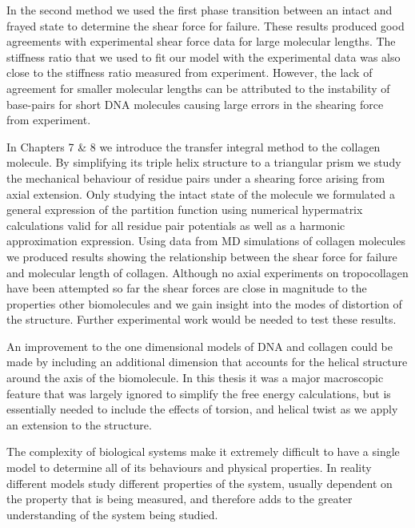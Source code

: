 In the second method we used the first phase transition between an intact and frayed state to determine the shear force for failure. These results produced good agreements with experimental shear force data for large molecular lengths. The stiffness ratio that we used to fit our model with the experimental data was also close to the stiffness ratio measured from experiment. However, the lack of agreement for smaller molecular lengths can be attributed to the instability of base-pairs for short DNA molecules causing large errors in the shearing force from experiment.

In Chapters 7 \& 8 we introduce the transfer integral method to the collagen molecule. By simplifying its triple helix structure to a triangular prism we study the mechanical behaviour of residue pairs under a shearing force arising from axial extension. Only studying the intact state of the molecule we formulated a general expression of the partition function using numerical hypermatrix calculations valid for all residue pair potentials as well as a harmonic approximation expression. Using data from MD simulations of collagen molecules we produced results showing the relationship between the shear force for failure and molecular length of collagen. Although no axial experiments on tropocollagen have been attempted so far the shear forces are close in magnitude to the properties other biomolecules and we gain insight into the modes of distortion of the structure. Further experimental work would be needed to test these results.

An improvement to the one dimensional models of DNA and collagen could be made by including an additional dimension that accounts for the helical structure around the axis of the biomolecule. In this thesis it was a major macroscopic feature that was largely ignored to simplify the free energy calculations, but is essentially needed to include the effects of torsion, and helical twist as we apply an extension to the structure.

The complexity of biological systems make it extremely difficult to have a single model to determine all of its behaviours and physical properties. In reality different models study different properties of the system, usually dependent on the property that is being measured, and therefore adds to the greater understanding of the system being studied.

\begin{comment}
The focus on free energy calculations in this thesis has been of significant importance in understanding biological processes when modelling biomolecules. The free energy and its derivatives are able to quantify the thermodyamic properties of a system representing the likelihood of a certain system configuration or chemical reaction. These properties are necessary to compare theory with experiment. This is an extremely difficult problem for molecular dynamics since the time-scales required for simulation are far too long to encompass all parts of configurational phase-space. Instead, the calculation of entropy change is more accurately made when have a Hamiltonian that completely describes the thermodynamic system where we can evaluate the partition function over all configurational phase-space.
\end{comment}
